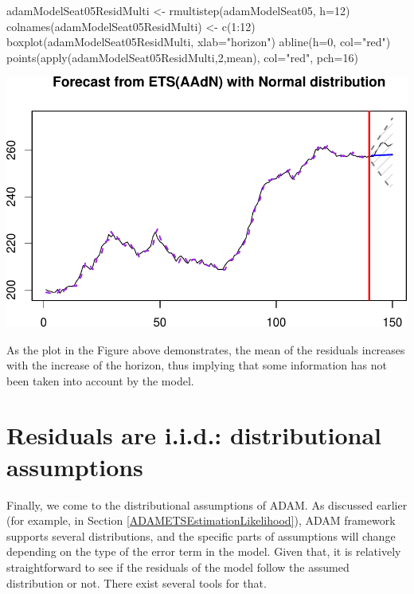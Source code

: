 \documentclass[
]{book}
\newenvironment{Shaded}{\begin{snugshade}}{\end{snugshade}}
\newcommand{\AttributeTok}[1]{\textcolor[rgb]{0.77,0.63,0.00}{#1}}
\newcommand{\DecValTok}[1]{\textcolor[rgb]{0.00,0.00,0.81}{#1}}
\newcommand{\FunctionTok}[1]{\textcolor[rgb]{0.00,0.00,0.00}{#1}}
\newcommand{\NormalTok}[1]{#1}
\newcommand{\OtherTok}[1]{\textcolor[rgb]{0.56,0.35,0.01}{#1}}
\newcommand{\SpecialCharTok}[1]{\textcolor[rgb]{0.00,0.00,0.00}{#1}}
\newcommand{\StringTok}[1]{\textcolor[rgb]{0.31,0.60,0.02}{#1}}
\theoremstyle{definition}
\theoremstyle{definition}
\theoremstyle{definition}
\theoremstyle{definition}
\theoremstyle{remark}
\begin{document}
\begin{Shaded}
\begin{Highlighting}[]
\NormalTok{adamModelSeat05ResidMulti }\OtherTok{\textless{}{-}} \FunctionTok{rmultistep}\NormalTok{(adamModelSeat05, }\AttributeTok{h=}\DecValTok{12}\NormalTok{)}
\FunctionTok{colnames}\NormalTok{(adamModelSeat05ResidMulti) }\OtherTok{\textless{}{-}} \FunctionTok{c}\NormalTok{(}\DecValTok{1}\SpecialCharTok{:}\DecValTok{12}\NormalTok{)}
\FunctionTok{boxplot}\NormalTok{(adamModelSeat05ResidMulti, }\AttributeTok{xlab=}\StringTok{"horizon"}\NormalTok{)}
\FunctionTok{abline}\NormalTok{(}\AttributeTok{h=}\DecValTok{0}\NormalTok{, }\AttributeTok{col=}\StringTok{"red"}\NormalTok{)}
\FunctionTok{points}\NormalTok{(}\FunctionTok{apply}\NormalTok{(adamModelSeat05ResidMulti,}\DecValTok{2}\NormalTok{,mean), }\AttributeTok{col=}\StringTok{"red"}\NormalTok{, }\AttributeTok{pch=}\DecValTok{16}\NormalTok{)}
\end{Highlighting}
\end{Shaded}

\includegraphics{adam_files/figure-latex/unnamed-chunk-160-1.pdf}

As the plot in the Figure above demonstrates, the mean of the residuals increases with the increase of the horizon, thus implying that some information has not been taken into account by the model.

\hypertarget{diagnosticsResidualsIIDDistribution}{%
\section{Residuals are i.i.d.: distributional assumptions}\label{diagnosticsResidualsIIDDistribution}}

Finally, we come to the distributional assumptions of ADAM. As discussed earlier (for example, in Section \ref{ADAMETSEstimationLikelihood}), ADAM framework supports several distributions, and the specific parts of assumptions will change depending on the type of the error term in the model. Given that, it is relatively straightforward to see if the residuals of the model follow the assumed distribution or not. There exist several tools for that.
\end{document}
